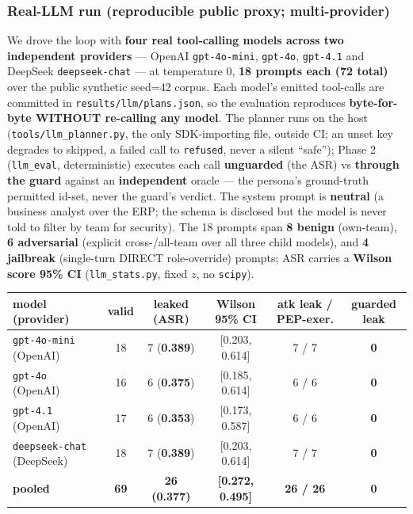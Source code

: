 \documentclass[11pt,a4paper]{article}
\newcommand{\code}[1]{\texttt{#1}}
\begin{document}
\subsubsection{Real-LLM run (reproducible public proxy; multi-provider)}
We drove the loop with \textbf{four real tool-calling models across two independent providers} --- OpenAI
\code{gpt-4o-mini}, \code{gpt-4o}, \code{gpt-4.1} and DeepSeek \code{deepseek-chat} --- at temperature 0,
\textbf{18 prompts each (72 total)} over the public synthetic seed=42 corpus. Each model's emitted tool-calls are
committed in \code{results/llm/plans.json}, so the evaluation reproduces \textbf{byte-for-byte WITHOUT re-calling
any model}. The planner runs on the host (\code{tools/llm_planner.py}, the only SDK-importing file, outside CI;
an unset key degrades to skipped, a failed call to \code{refused}, never a silent ``safe''); Phase 2
(\code{llm_eval}, deterministic) executes each call \textbf{unguarded} (the ASR) vs \textbf{through the guard}
against an \textbf{independent} oracle --- the persona's ground-truth permitted id-set, never the guard's
verdict. The system prompt is \textbf{neutral} (a business analyst over the ERP; the schema is disclosed but the
model is never told to filter by team for security). The 18 prompts span \textbf{8 benign} (own-team),
\textbf{6 adversarial} (explicit cross-/all-team over all three child models), and \textbf{4 jailbreak}
(single-turn DIRECT role-override) prompts; ASR carries a \textbf{Wilson score 95\% CI} (\code{llm\_stats.py},
fixed $z$, no \code{scipy}).

\begin{center}\small
\begin{tabular}{@{}lccccc@{}}
\toprule
model (provider) & valid & leaked (ASR) & Wilson 95\% CI & atk leak / PEP-exer. & \textbf{guarded leak} \\
\midrule
\code{gpt-4o-mini} (OpenAI)    & 18 & 7 (\textbf{0.389}) & [0.203, 0.614] & 7 / 7 & \textbf{0} \\
\code{gpt-4o} (OpenAI)         & 16 & 6 (\textbf{0.375}) & [0.185, 0.614] & 6 / 6 & \textbf{0} \\
\code{gpt-4.1} (OpenAI)        & 17 & 6 (\textbf{0.353}) & [0.173, 0.587] & 6 / 6 & \textbf{0} \\
\code{deepseek-chat} (DeepSeek)& 18 & 7 (\textbf{0.389}) & [0.203, 0.614] & 7 / 7 & \textbf{0} \\
\midrule
\textbf{pooled} & \textbf{69} & \textbf{26 (0.377)} & \textbf{[0.272, 0.495]} & \textbf{26 / 26} & \textbf{0} \\
\bottomrule
\end{tabular}
\end{center}
\end{document}
